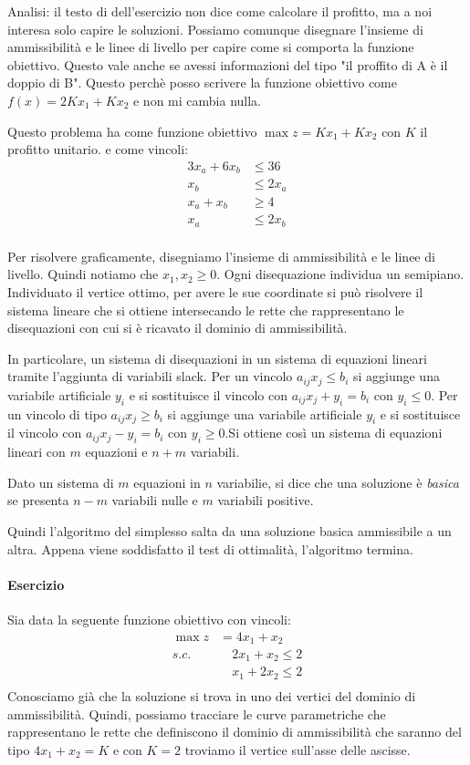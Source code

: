 \documentclass{article}
\begin{document}
Analisi: il testo di dell'esercizio non dice come calcolare il profitto, ma a noi 
interesa solo capire le soluzioni. Possiamo comunque disegnare l'insieme di ammissibilità
e le linee di livello per capire come si comporta la funzione obiettivo. Questo vale anche 
se avessi informazioni del tipo "il proffito di A è il doppio di B". Questo perchè 
posso scrivere la funzione obiettivo come $f(x) = 2Kx_1 + Kx_2$ e non mi cambia nulla.

Questo problema ha come funzione obiettivo $\max z =Kx_1 + Kx_2$ con $K$ il profitto unitario.
e come vincoli:
\begin{align*}
  3x_a + 6x_b &\leq 36\\ 
  x_b &\leq 2x_a \\
  x_a + x_b &\geq 4 \\ 
  x_a &\leq 2x_b \\
\end{align*}

Per risolvere graficamente, disegniamo l'insieme di ammissibilità e le linee di livello.
Quindi notiamo che $x_1,x_2 \geq 0$. Ogni disequazione individua un semipiano. 
Individuato il vertice ottimo, per avere le sue coordinate si può risolvere il sistema lineare 
che si ottiene intersecando le rette che rappresentano le disequazioni con cui si è
ricavato il dominio di ammissibilità.

In particolare, un sistema di disequazioni in un sistema di equazioni lineari 
tramite l'aggiunta di variabili slack. Per un vincolo $a_{ij}x_j \leq b_i$ 
si aggiunge una variabile artificiale $y_{i}$ e si sostituisce il vincolo con 
$a_{ij}x_j + y_{i} = b_i$ con $y_i \leq 0$. Per un vincolo di tipo $a_{ij}x_j \geq b_i$ 
si aggiunge una variabile artificiale $y_{i}$ e si sostituisce il vincolo con 
$a_{ij}x_j - y_{i} = b_i$ con $y_i \geq 0$.Si ottiene così un sistema di equazioni lineari 
con $m$ equazioni e $n+m$ variabili. 

Dato un sistema di $m$ equazioni in $n$ variabilie, si dice che una soluzione 
è \emph{basica} se presenta $n-m$ variabili nulle e $m$ variabili positive.  

Quindi l'algoritmo del simplesso salta da una soluzione basica ammissibile a un 
altra. Appena viene soddisfatto il test di ottimalità, l'algoritmo termina.

\paragraph{Esercizio} 
Sia data la seguente funzione obiettivo con vincoli:
\begin{align*}
  \max z &= 4x_1 + x_2 \\ 
  s.c. &\quad 2x_1 + x_2 \leq 2\\ 
  &\quad x_1 + 2x_2 \leq 2\\ 
\end{align*}
Conosciamo già che la soluzione si trova in uno dei vertici del dominio di ammissibilità.
Quindi, possiamo tracciare le curve parametriche che rappresentano le rette che 
definiscono il dominio di ammissibilità che saranno del tipo $4x_1 + x_2 = K$ e 
con $K=2$ troviamo il vertice sull'asse delle ascisse.\\ 
\end{document}
